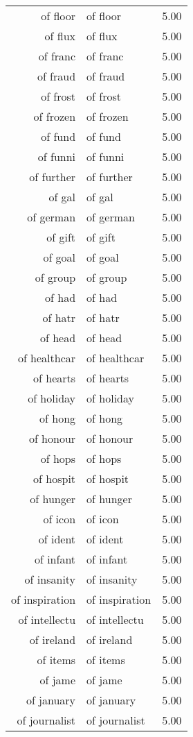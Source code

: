 \begin{table}[ht]
\begin{tabular}{rlr}
  of floor & of floor & 5.00 \\ 
  of flux & of flux & 5.00 \\ 
  of franc & of franc & 5.00 \\ 
  of fraud & of fraud & 5.00 \\ 
  of frost & of frost & 5.00 \\ 
  of frozen & of frozen & 5.00 \\ 
  of fund & of fund & 5.00 \\ 
  of funni & of funni & 5.00 \\ 
  of further & of further & 5.00 \\ 
  of gal & of gal & 5.00 \\ 
  of german & of german & 5.00 \\ 
  of gift & of gift & 5.00 \\ 
  of goal & of goal & 5.00 \\ 
  of group & of group & 5.00 \\ 
  of had & of had & 5.00 \\ 
  of hatr & of hatr & 5.00 \\ 
  of head & of head & 5.00 \\ 
  of healthcar & of healthcar & 5.00 \\ 
  of hearts & of hearts & 5.00 \\ 
  of holiday & of holiday & 5.00 \\ 
  of hong & of hong & 5.00 \\ 
  of honour & of honour & 5.00 \\ 
  of hops & of hops & 5.00 \\ 
  of hospit & of hospit & 5.00 \\ 
  of hunger & of hunger & 5.00 \\ 
  of icon & of icon & 5.00 \\ 
  of ident & of ident & 5.00 \\ 
  of infant & of infant & 5.00 \\ 
  of insanity & of insanity & 5.00 \\ 
  of inspiration & of inspiration & 5.00 \\ 
  of intellectu & of intellectu & 5.00 \\ 
  of ireland & of ireland & 5.00 \\ 
  of items & of items & 5.00 \\ 
  of jame & of jame & 5.00 \\ 
  of january & of january & 5.00 \\ 
  of journalist & of journalist & 5.00 \\ 

\end{tabular}
\end{table}

